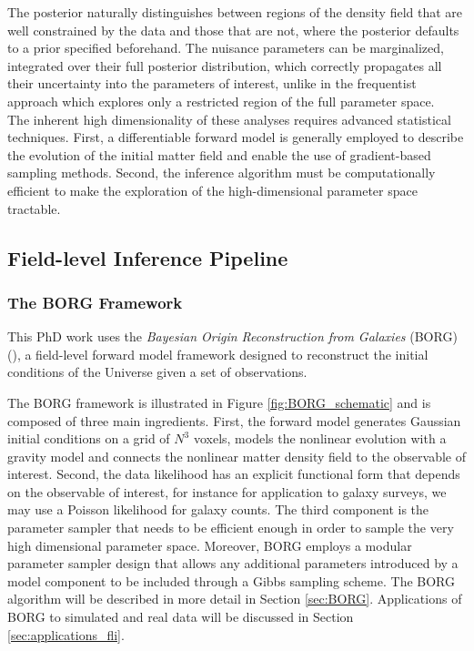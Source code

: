 The posterior naturally distinguishes between regions of 
the density field that are well constrained by the data and those that are not, where the posterior defaults to a prior specified beforehand. The nuisance parameters 
can be marginalized, integrated over their full posterior distribution, which correctly propagates all their uncertainty into the parameters of interest, unlike 
in the frequentist approach which explores only a restricted region of the full parameter space. \\

The inherent high dimensionality of these analyses requires advanced statistical techniques. First, a differentiable forward model is generally employed to describe the 
evolution of the initial matter field and enable the use of gradient-based sampling methods. Second, the inference algorithm must be computationally efficient to make 
the exploration of the high-dimensional parameter space tractable. 

\subsection{Field-level Inference Pipeline}

\subsubsection{The BORG Framework}

This PhD work uses the \textit{Bayesian Origin Reconstruction from Galaxies} (BORG) (\cite{Jens_2013, Jasche_2019}), a field-level forward model framework designed to 
reconstruct the initial conditions of the Universe given a set of observations. 


The BORG framework is illustrated in Figure \ref{fig:BORG_schematic} and is composed of three main ingredients. First, 
the forward model generates Gaussian initial conditions on a grid of $N^3$ voxels, models the nonlinear 
evolution with a gravity model and connects the nonlinear matter density field to the 
observable of interest. Second, the data likelihood has an explicit functional form that depends on 
the observable of interest, for instance for application to galaxy surveys, we may use a Poisson 
likelihood for galaxy counts. The third component is the parameter sampler that needs to be 
efficient enough in order to sample the very high dimensional parameter space. Moreover, BORG 
employs a modular parameter sampler design that allows any additional parameters introduced 
by a model component to be included through a Gibbs sampling scheme. 
The BORG algorithm will be described in more detail in Section \ref{sec:BORG}. 
Applications of BORG to simulated and real data will be discussed in Section \ref{sec:applications_fli}. 

